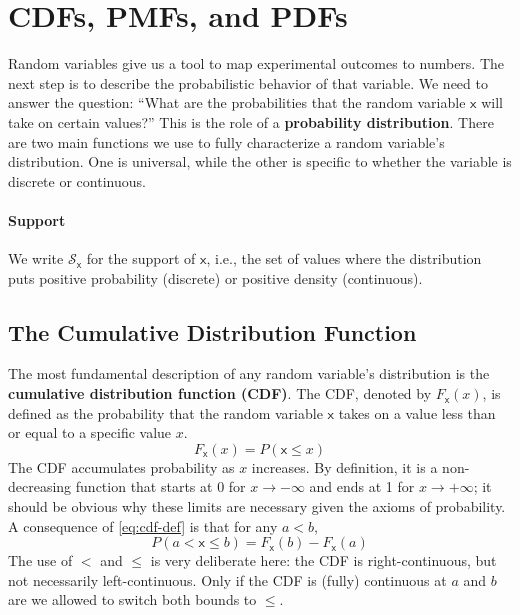 \section{CDFs, PMFs, and PDFs}
Random variables give us a tool to map experimental outcomes to numbers. The next step is to describe the probabilistic behavior of that variable. We need to answer the question: ``What are the probabilities that the random variable $\mathsf{x}$ will take on certain values?'' This is the role of a \textbf{probability distribution}. There are two main functions we use to fully characterize a random variable's distribution. One is universal, while the other is specific to whether the variable is discrete or continuous.

\paragraph*{Support}
We write $\mathcal{S}_{\mathsf{x}}$ for the support of $\mathsf{x}$, i.e., the set of values where the distribution puts positive probability (discrete) or positive density (continuous).

\subsection{The Cumulative Distribution Function}
The most fundamental description of any random variable's distribution is the \textbf{cumulative distribution function (CDF)}. The CDF, denoted by $F_{\mathsf{x}}(x)$, is defined as the probability that the random variable $\mathsf{x}$ takes on a value less than or equal to a specific value $x$.
\begin{equation}
    F_{\mathsf{x}}(x) = P(\mathsf{x} \le x)
    \label{eq:cdf-def}
\end{equation}
The CDF accumulates probability as $x$ increases. By definition, it is a non-decreasing function that starts at 0 for $x \to -\infty$ and ends at 1 for $x \to +\infty$; it should be obvious why these limits are necessary given the axioms of probability. A consequence of \autoref{eq:cdf-def} is that for any $a<b$,
\begin{equation}
    P(a<\mathsf{x}\le b)=F_{\mathsf{x}}(b)-F_{\mathsf{x}}(a)
    \label{eq:cdf-range}
\end{equation}
The use of $<$ and $\le$ is very deliberate here: the CDF is right-continuous, but not necessarily left-continuous. Only if the CDF is (fully) continuous at $a$ and $b$ are we allowed to switch both bounds to $\le$.

